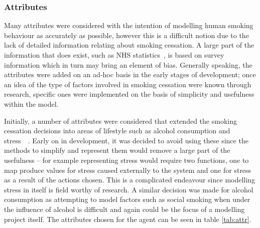 \documentclass[]{report}
\begin{document}
\subsubsection{Attributes}
Many attributes were considered with the intention of modelling human smoking behaviour as accurately as possible, however this is a difficult notion due to the lack of detailed information relating about smoking cessation. A large part of the information that does exist, such as NHS statistics~\cite{NHS-43}, is based on survey information which in turn may bring an element of bias. Generally speaking, the attributes were added on an ad-hoc basis in the early stages of development; once an idea of the type of factors involved in smoking cessation were known through research, specific ones were implemented on the basis of simplicity and usefulness within the model.

Initially, a number of attributes were considered that extended the smoking cessation decisions into areas of lifestyle such as alcohol consumption and stress~\cite{NHS-44}~\cite{malay}. Early on in development, it was decided to avoid using these since the methods to simplify and represent them would remove a large part of the usefulness – for example representing stress would require two functions, one to map produce values for stress caused externally to the system and one for stress as a result of the actions chosen. This is a complicated endeavour since modelling stress in itself is field worthy of research. A similar decision was made for alcohol consumption as attempting to model factors such as social smoking when under the influence of alcohol is difficult and again could be the focus of a modelling project itself.
The attributes chosen for the agent can be seen in table \ref{tab:attr}.
\end{document}

